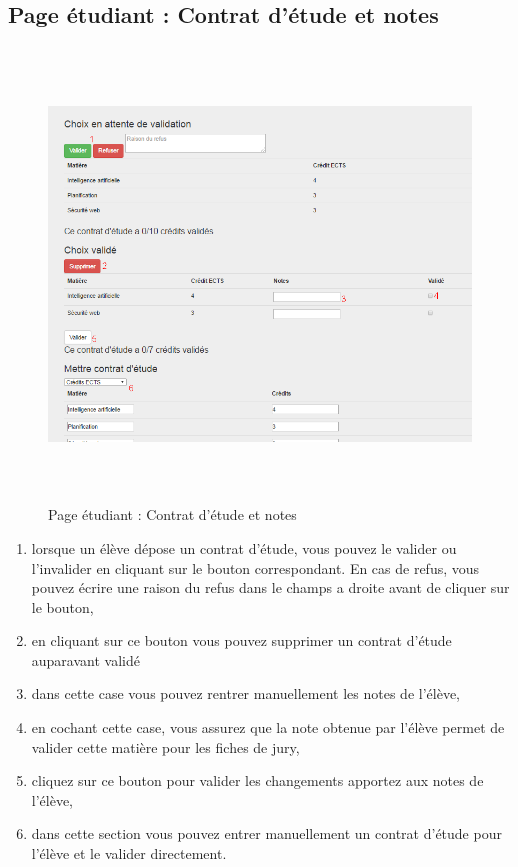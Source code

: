      \subsection{Page étudiant : Contrat d'étude et notes}
     \label{en}
     \begin{figure}[H]
     	\centering
     	\includegraphics[width=16cm,height=12cm]{Images/Admin/note_admin.png}
     	\caption{Page étudiant : Contrat d'étude et notes}
     	
     \end{figure}
     \begin{enumerate}
     	\item lorsque un élève dépose un contrat d'étude, vous pouvez le valider ou l'invalider en cliquant sur le bouton correspondant. En cas de refus, vous pouvez écrire une raison du refus dans le champs a droite avant de cliquer sur le bouton,
     	\item en cliquant sur ce bouton vous pouvez supprimer un contrat d'étude auparavant validé 
     	\item dans cette case vous pouvez rentrer manuellement les notes de l'élève,
     	\item en cochant cette case, vous assurez que la note obtenue par l'élève permet de valider cette matière pour les fiches de jury,
     	\item cliquez sur ce bouton pour valider les changements apportez aux notes de l'élève,
     	\item dans cette section vous pouvez entrer manuellement un contrat d'étude pour l'élève et le valider directement.
     \end{enumerate}
     
